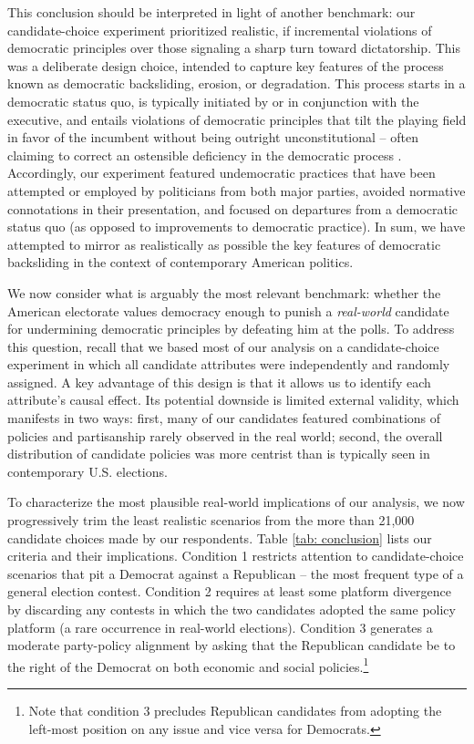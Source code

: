 \documentclass[letterpaper, 12pt]{article}
\begin{document}
\begin{raggedright}
This conclusion should be interpreted in light of another benchmark: our candidate-choice experiment prioritized realistic, if incremental violations of democratic principles over those signaling a sharp turn toward dictatorship. This was a deliberate design choice, intended to capture key features of the process known as democratic backsliding, erosion, or degradation. This process starts in a democratic status quo, is typically initiated by or in conjunction with the executive, and entails violations of democratic principles that tilt the playing field in favor of the incumbent without being outright unconstitutional -- often claiming to correct an ostensible deficiency in the democratic process \citep{HuqGinsburg2017,Levitsky2018, Svolik2019a}. Accordingly, our experiment featured undemocratic practices that have been attempted or employed by politicians from both major parties, avoided normative connotations in their presentation, and focused on departures from a democratic status quo (as opposed to improvements to democratic practice). In sum, we have attempted to mirror as realistically as possible the key features of democratic backsliding in the context of contemporary American politics. 


We now consider what is arguably the most relevant benchmark: whether the American electorate values democracy enough to punish a \emph{real-world} candidate for undermining democratic principles by defeating him at the polls. To address this question, recall that we based most of our analysis on a candidate-choice experiment in which all candidate attributes were independently and randomly assigned. A key advantage of this design is that it allows us to identify each attribute's causal effect. Its potential downside is limited external validity, which manifests in two ways: first, many of our candidates featured combinations of policies and partisanship rarely observed in the real world; second, the overall distribution of candidate policies was more centrist than is typically seen in contemporary U.S. elections.

To characterize the most plausible real-world implications of our analysis, we now progressively trim the least realistic scenarios from the more than 21,000 candidate choices made by our respondents. Table \ref{tab: conclusion} lists our criteria and their implications. Condition 1 restricts attention to candidate-choice scenarios that pit a Democrat against a Republican -- the most frequent type of a general election contest. Condition 2 requires at least some platform divergence by discarding any contests in which the two candidates adopted the same policy platform (a rare occurrence in real-world elections). Condition 3 generates a moderate party-policy alignment by asking that the Republican candidate be to the right of the Democrat on both economic and social policies.\footnote{Note that condition 3 precludes Republican candidates from adopting the left-most position on any issue and vice versa for Democrats.}



\end{raggedright}
\end{document}
